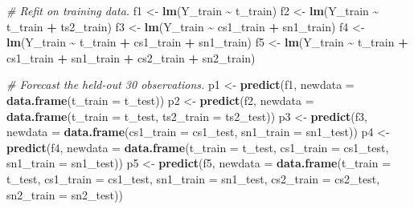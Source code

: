 \documentclass[
  10pt,
]{extarticle}
\newenvironment{Shaded}{\begin{snugshade}}{\end{snugshade}}
\newcommand{\AttributeTok}[1]{\textcolor[rgb]{0.13,0.29,0.53}{#1}}
\newcommand{\CommentTok}[1]{\textcolor[rgb]{0.56,0.35,0.01}{\textit{#1}}}
\newcommand{\FunctionTok}[1]{\textcolor[rgb]{0.13,0.29,0.53}{\textbf{#1}}}
\newcommand{\NormalTok}[1]{#1}
\newcommand{\OtherTok}[1]{\textcolor[rgb]{0.56,0.35,0.01}{#1}}
\newcommand{\SpecialCharTok}[1]{\textcolor[rgb]{0.81,0.36,0.00}{\textbf{#1}}}
\begin{document}
\begin{Shaded}
\begin{Highlighting}[]
\CommentTok{\# Refit on training data.}
\NormalTok{f1 }\OtherTok{\textless{}{-}} \FunctionTok{lm}\NormalTok{(Y\_train }\SpecialCharTok{\textasciitilde{}}\NormalTok{ t\_train)}
\NormalTok{f2 }\OtherTok{\textless{}{-}} \FunctionTok{lm}\NormalTok{(Y\_train }\SpecialCharTok{\textasciitilde{}}\NormalTok{ t\_train }\SpecialCharTok{+}\NormalTok{ ts2\_train)}
\NormalTok{f3 }\OtherTok{\textless{}{-}} \FunctionTok{lm}\NormalTok{(Y\_train }\SpecialCharTok{\textasciitilde{}}\NormalTok{ cs1\_train }\SpecialCharTok{+}\NormalTok{ sn1\_train)}
\NormalTok{f4 }\OtherTok{\textless{}{-}} \FunctionTok{lm}\NormalTok{(Y\_train }\SpecialCharTok{\textasciitilde{}}\NormalTok{ t\_train }\SpecialCharTok{+}\NormalTok{ cs1\_train }\SpecialCharTok{+}\NormalTok{ sn1\_train)}
\NormalTok{f5 }\OtherTok{\textless{}{-}} \FunctionTok{lm}\NormalTok{(Y\_train }\SpecialCharTok{\textasciitilde{}}\NormalTok{ t\_train }\SpecialCharTok{+}\NormalTok{ cs1\_train }\SpecialCharTok{+}\NormalTok{ sn1\_train }\SpecialCharTok{+}\NormalTok{ cs2\_train }\SpecialCharTok{+}\NormalTok{ sn2\_train)}

\CommentTok{\# Forecast the held{-}out 30 observations.}
\NormalTok{p1 }\OtherTok{\textless{}{-}} \FunctionTok{predict}\NormalTok{(f1, }\AttributeTok{newdata =} \FunctionTok{data.frame}\NormalTok{(}\AttributeTok{t\_train =}\NormalTok{ t\_test))}
\NormalTok{p2 }\OtherTok{\textless{}{-}} \FunctionTok{predict}\NormalTok{(f2, }\AttributeTok{newdata =} \FunctionTok{data.frame}\NormalTok{(}\AttributeTok{t\_train =}\NormalTok{ t\_test, }\AttributeTok{ts2\_train =}\NormalTok{ ts2\_test))}
\NormalTok{p3 }\OtherTok{\textless{}{-}} \FunctionTok{predict}\NormalTok{(f3, }\AttributeTok{newdata =} \FunctionTok{data.frame}\NormalTok{(}\AttributeTok{cs1\_train =}\NormalTok{ cs1\_test, }\AttributeTok{sn1\_train =}\NormalTok{ sn1\_test))}
\NormalTok{p4 }\OtherTok{\textless{}{-}} \FunctionTok{predict}\NormalTok{(f4, }\AttributeTok{newdata =} \FunctionTok{data.frame}\NormalTok{(}\AttributeTok{t\_train =}\NormalTok{ t\_test, }\AttributeTok{cs1\_train =}\NormalTok{ cs1\_test, }\AttributeTok{sn1\_train =}\NormalTok{ sn1\_test))}
\NormalTok{p5 }\OtherTok{\textless{}{-}} \FunctionTok{predict}\NormalTok{(f5, }\AttributeTok{newdata =} \FunctionTok{data.frame}\NormalTok{(}\AttributeTok{t\_train =}\NormalTok{ t\_test, }\AttributeTok{cs1\_train =}\NormalTok{ cs1\_test, }\AttributeTok{sn1\_train =}\NormalTok{ sn1\_test, }\AttributeTok{cs2\_train =}\NormalTok{ cs2\_test, }\AttributeTok{sn2\_train =}\NormalTok{ sn2\_test))}


\end{Highlighting}
\end{Shaded}
\end{document}
